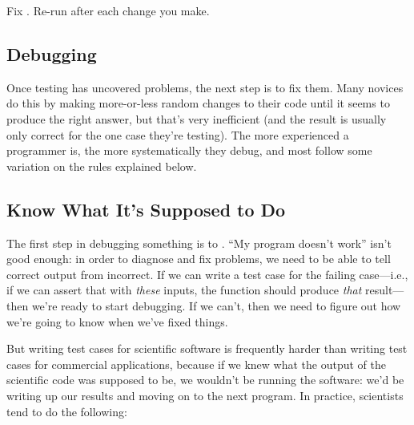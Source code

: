 \begin{challenge}
  Fix . Re-run 
  after each change you make.
\end{challenge}

\subsection{Debugging}

Once testing has uncovered problems, the next step is to fix them. Many
novices do this by making more-or-less random changes to their code
until it seems to produce the right answer, but that's very inefficient
(and the result is usually only correct for the one case they're
testing). The more experienced a programmer is, the more systematically
they debug, and most follow some variation on the rules explained below.

\subsection*{Know What It's Supposed to Do}

The first step in debugging something is to
. ``My program doesn't work'' isn't good enough: in order
to diagnose and fix problems, we need to be able to tell correct output
from incorrect. If we can write a test case for the failing case---i.e.,
if we can assert that with \emph{these} inputs, the function should
produce \emph{that} result--- then we're ready to start debugging. If we
can't, then we need to figure out how we're going to know when we've
fixed things.

But writing test cases for scientific software is frequently harder than
writing test cases for commercial applications, because if we knew what
the output of the scientific code was supposed to be, we wouldn't be
running the software: we'd be writing up our results and moving on to
the next program. In practice, scientists tend to do the following:

